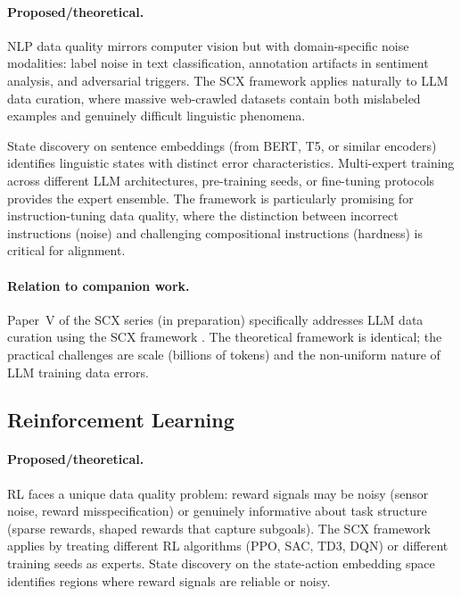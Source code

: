 \documentclass[twocolumn]{article}
\theoremstyle{definition}
\begin{document}
\paragraph{Proposed/theoretical.}
NLP data quality mirrors computer vision but with domain-specific noise modalities: label noise in text classification, annotation artifacts in sentiment analysis, and adversarial triggers. The SCX framework applies naturally to LLM data curation, where massive web-crawled datasets contain both mislabeled examples and genuinely difficult linguistic phenomena.

State discovery on sentence embeddings (from BERT, T5, or similar encoders) identifies linguistic states with distinct error characteristics. Multi-expert training across different LLM architectures, pre-training seeds, or fine-tuning protocols provides the expert ensemble. The framework is particularly promising for instruction-tuning data quality, where the distinction between incorrect instructions (noise) and challenging compositional instructions (hardness) is critical for alignment.

\paragraph{Relation to companion work.}
Paper~V of the SCX series (in preparation) specifically addresses LLM data curation using the SCX framework \cite{paperV}. The theoretical framework is identical; the practical challenges are scale (billions of tokens) and the non-uniform nature of LLM training data errors.

\subsection{Reinforcement Learning}

\paragraph{Proposed/theoretical.}
RL faces a unique data quality problem: reward signals may be noisy (sensor noise, reward misspecification) or genuinely informative about task structure (sparse rewards, shaped rewards that capture subgoals). The SCX framework applies by treating different RL algorithms (PPO, SAC, TD3, DQN) or different training seeds as experts. State discovery on the state-action embedding space identifies regions where reward signals are reliable or noisy.
\end{document}
